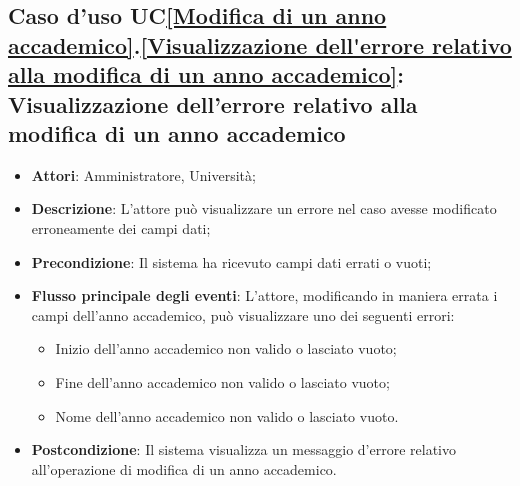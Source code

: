 \subsection{Caso d'uso UC\ref{Modifica di un anno accademico}.\ref{Visualizzazione dell'errore relativo alla modifica di un anno accademico}: Visualizzazione dell'errore relativo alla modifica di un anno accademico}
\begin{itemize}
	\item \textbf{Attori}: Amministratore, Università;
	\item \textbf{Descrizione}: L'attore può visualizzare un errore nel caso avesse modificato erroneamente dei campi dati;
	\item \textbf{Precondizione}: Il sistema ha ricevuto campi dati errati o vuoti;
	\item \textbf{Flusso principale degli eventi}: L'attore, modificando in maniera errata i campi dell'anno accademico, può visualizzare uno dei seguenti errori: 
	\begin{itemize}
		\item Inizio dell'anno accademico non valido o lasciato vuoto; 
		\item Fine dell'anno accademico non valido o lasciato vuoto; 
		\item Nome dell'anno accademico non valido o lasciato vuoto. 
	\end{itemize}
	\item \textbf{Postcondizione}: Il sistema visualizza un messaggio d'errore relativo all'operazione di modifica di un anno accademico.
\end{itemize}








